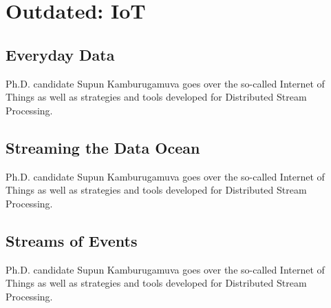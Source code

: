 


\chapter{Outdated: IoT}
\label{sec:icloud-iot}

\FILENAME


\section{Everyday Data}

Ph.D. candidate Supun Kamburugamuva goes over the so-called Internet of
Things as well as strategies and tools developed for Distributed Stream
Processing.




\section{Streaming the Data Ocean}

Ph.D. candidate Supun Kamburugamuva goes over the so-called Internet of
Things as well as strategies and tools developed for Distributed Stream
Processing.



\section{Streams of Events}

Ph.D. candidate Supun Kamburugamuva goes over the so-called Internet of
Things as well as strategies and tools developed for Distributed Stream
Processing.


